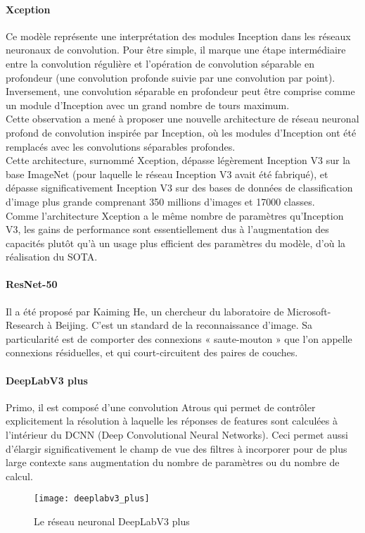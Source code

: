 \documentclass[
10pt,
a4paper, 
oneside, 
headinclude,footinclude, 
]{scrartcl}
\begin{document}
\paragraph{Xception}
Ce modèle représente une interprétation des modules Inception dans les réseaux neuronaux de convolution. Pour être simple, il marque une étape intermédiaire entre la convolution régulière et l’opération de convolution séparable en profondeur\cite{cho2017xception} (une convolution profonde suivie par une convolution par point).
\\
Inversement, une convolution séparable en profondeur peut être comprise comme un module d’Inception avec un grand nombre de tours maximum.
\\
Cette observation a mené à proposer une nouvelle architecture de réseau neuronal profond de convolution inspirée par Inception, où les modules d’Inception ont été remplacés avec les convolutions séparables profondes.
\\
Cette architecture, surnommé Xception, dépasse légèrement Inception V3 sur la base ImageNet (pour laquelle le réseau Inception V3 avait été fabriqué), et dépasse significativement Inception V3 sur des bases de données de classification d’image plus grande comprenant 350 millions d’images et 17000 classes.
\\
Comme l’architecture Xception a le même nombre de paramètres qu’Inception V3, les gains de performance sont essentiellement dus à l’augmentation des capacités plutôt qu’à un usage plus efficient des paramètres du modèle, d’où la réalisation du SOTA.

\paragraph{ResNet-50}
Il a été proposé par Kaiming He, un chercheur du laboratoire de Microsoft-Research à Beijing. C’est un standard de la reconnaissance d’image. Sa particularité est de comporter des connexions « saute-mouton » que l’on appelle connexions résiduelles\cite{LeCun_2019_qlma}, et qui court-circuitent des paires de couches.
 
\paragraph{DeepLabV3 plus}
Primo, il est composé d’une convolution Atrous\cite{deeplabv3plus2018} qui permet de contrôler explicitement la résolution à laquelle les réponses de features sont calculées à l’intérieur du \gls{DCNN} (Deep Convolutional Neural Networks). Ceci permet aussi d’élargir significativement le champ de vue des filtres à incorporer pour de plus large contexte sans augmentation du nombre de paramètres ou du nombre de calcul.
\begin{figure}[htb]
\centering 
\texttt{[image: deeplabv3\_plus]} 
\caption[DeepLabV3 plus]{Le réseau neuronal DeepLabV3 plus} 
\label{fig:deeplabv3_plus} 
\end{figure}
\end{document}
